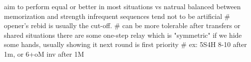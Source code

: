 aim to perform equal or better in most situations vs natrual
balanced between memorization and strength
    infrequent sequences tend not to be artificial
    # opener's rebid is usually the cut-off.
    # can be more tolerable after transfers or shared situations
there are some one-step relay which is "symmetric"
if we hide some hands, usually showing it next round is first priority
    # ex: 5S4H 8-10 after 1m, or 6+oM inv after 1M